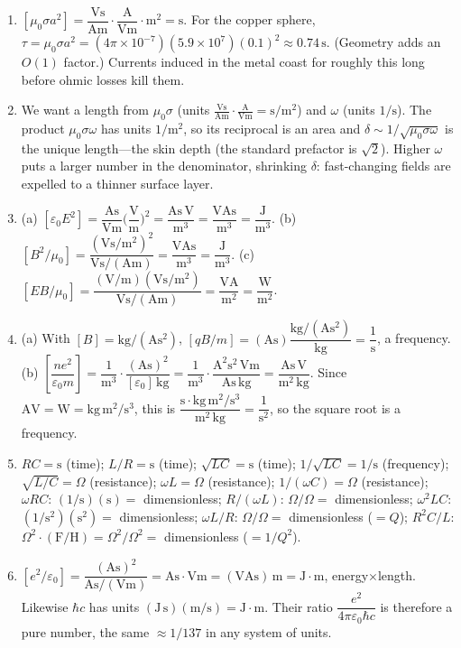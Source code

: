 \documentclass[11pt]{article}
\theoremstyle{mystyle}
\newcommand{\V}{\text{V}}
\newcommand{\A}{\text{A}}
\newcommand{\s}{\text{s}}
\newcommand{\m}{\text{m}}
\newcommand{\Ohm}{\Omega}
\begin{document}
\begin{enumerate}
\item $[\mu_0\sigma a^2]=\dfrac{\V\s}{\A\m}\cdot\dfrac{\A}{\V\m}\cdot\m^2=\s$.
For the copper sphere, $\tau=\mu_0\sigma a^2
=(4\pi\times10^{-7})(5.9\times10^{7})(0.1)^2\approx 0.74\,\s$. (Geometry adds an
$O(1)$ factor.) Currents induced in the metal coast for roughly this long before ohmic
losses kill them.

\item We want a length from $\mu_0\sigma$ (units
$\frac{\V\s}{\A\m}\cdot\frac{\A}{\V\m}=\s/\m^2$) and $\omega$ (units $1/\s$). The
product $\mu_0\sigma\omega$ has units $1/\m^2$, so its reciprocal is an area and
$\delta\sim 1/\sqrt{\mu_0\sigma\omega}$ is the unique length---the skin depth (the
standard prefactor is $\sqrt{2}$). Higher $\omega$ puts a larger number in the
denominator, shrinking $\delta$: fast-changing fields are expelled to a thinner surface
layer.

\item
(a) $[\varepsilon_0 E^2]=\dfrac{\A\s}{\V\m}\Big(\dfrac{\V}{\m}\Big)^2
=\dfrac{\A\s\,\V}{\m^3}=\dfrac{\V\A\s}{\m^3}=\dfrac{\text{J}}{\m^3}$.
(b) $[B^2/\mu_0]=\dfrac{(\V\s/\m^2)^2}{\V\s/(\A\m)}
=\dfrac{\V\A\s}{\m^3}=\dfrac{\text{J}}{\m^3}$.
(c) $[EB/\mu_0]=\dfrac{(\V/\m)(\V\s/\m^2)}{\V\s/(\A\m)}=\dfrac{\V\A}{\m^2}
=\dfrac{\text{W}}{\m^2}$.

\item
(a) With $[B]=\text{kg}/(\A\s^2)$,
$[qB/m]=(\A\s)\dfrac{\text{kg}/(\A\s^2)}{\text{kg}}=\dfrac{1}{\s}$, a frequency.
(b) $\left[\dfrac{ne^2}{\varepsilon_0 m}\right]
=\dfrac{1}{\m^3}\cdot\dfrac{(\A\s)^2}{[\varepsilon_0]\,\text{kg}}
=\dfrac{1}{\m^3}\cdot\dfrac{\A^2\s^2\,\V\m}{\A\s\,\text{kg}}
=\dfrac{\A\s\,\V}{\m^2\,\text{kg}}$. Since $\A\V=\text{W}=\text{kg}\,\m^2/\s^3$, this
is $\dfrac{\s\cdot\text{kg}\,\m^2/\s^3}{\m^2\,\text{kg}}=\dfrac{1}{\s^2}$, so the square
root is a frequency.

\item
$RC=\s$ (time);\quad
$L/R=\s$ (time);\quad
$\sqrt{LC}=\s$ (time);\quad
$1/\sqrt{LC}=1/\s$ (frequency);\quad
$\sqrt{L/C}=\Ohm$ (resistance);\quad
$\omega L=\Ohm$ (resistance);\quad
$1/(\omega C)=\Ohm$ (resistance);\quad
$\omega RC$: $(1/\s)(\s)=$ dimensionless;\quad
$R/(\omega L)$: $\Ohm/\Ohm=$ dimensionless;\quad
$\omega^2 LC$: $(1/\s^2)(\s^2)=$ dimensionless;\quad
$\omega L/R$: $\Ohm/\Ohm=$ dimensionless ($=Q$);\quad
$R^2C/L$: $\Ohm^2\cdot(\text{F}/\text{H})=\Ohm^2/\Ohm^2=$ dimensionless ($=1/Q^2$).

\item $[e^2/\varepsilon_0]=\dfrac{(\A\s)^2}{\A\s/(\V\m)}=\A\s\cdot\V\m
=(\V\A\s)\,\m=\text{J}\cdot\m$, energy$\times$length. Likewise $\hbar c$ has units
$(\text{J}\,\s)(\m/\s)=\text{J}\cdot\m$. Their ratio
$\dfrac{e^2}{4\pi\varepsilon_0\hbar c}$ is therefore a pure number, the same
$\approx 1/137$ in any system of units.

\end{enumerate}
\end{document}
